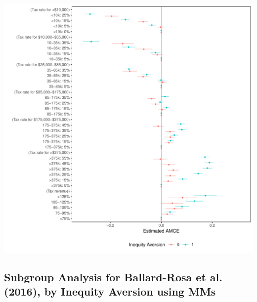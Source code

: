 \documentclass[a4paper,12pt]{article}\usepackage[]{graphicx}\usepackage[]{color}
\makeatletter
\def\maxwidth{ %
  \ifdim\Gin@nat@width>\linewidth
    \linewidth
  \else
    \Gin@nat@width
  \fi
}
\newenvironment{knitrout}{}{} %
\makeatother
\begin{document}
\begin{knitrout}
\color{fgcolor}
\includegraphics[width=\maxwidth]{figure/bms_subgroup_amce_appendix2-1} 

\end{knitrout}

\clearpage

\subsection{Subgroup Analysis for Ballard-Rosa et al. (2016), by Inequity Aversion using MMs}
\end{document}
